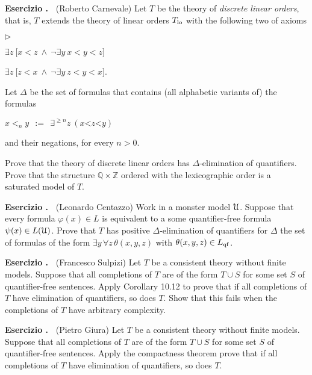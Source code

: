 \documentclass[10pt]{article}
\def\phi{\varphi}
\def\U{\EuScript U}
\def\ZZ{\mathds Z}
\def\QQ{\mathds Q}
\def\E{\exists}
\def\A{\forall}
\newcommand{\labella}[1]{{\sf\footnotesize #1}\hfill}
\renewenvironment{itemize}
  {\begin{list}{$\triangleright$}{%
   \setlength{\parskip}{0mm}
   \setlength{\topsep}{0mm}
   \setlength{\rightmargin}{0mm}
   \setlength{\listparindent}{0mm}
   \setlength{\itemindent}{0mm}
   \setlength{\labelwidth}{3ex}
   \setlength{\itemsep}{0mm}
   \setlength{\parsep}{0mm}
   \setlength{\partopsep}{0mm}
   \setlength{\labelsep}{1ex}
   \setlength{\leftmargin}{\labelwidth+\labelsep}
   \let\makelabel\labella}}{%
   \vspace*{-.3\baselineskip}
  \end{list}}
\newcounter{ex}
\newenvironment{exercise}{\bigskip\addtocounter{ex}{1}\textbf{Esercizio \theex.\ }}{}
\begin{document}
\begin{exercise}
  (Roberto Carnevale)
  Let $T$ be the theory of \emph{discrete linear orders}, that is, $T$ extends the theory of linear orders $T_{\rm lo}$ with the following two of axioms
  \begin{itemize}
  \item[dis$\uparrow$.] $\E z\ \big[x<z\ \wedge\ \neg\E y\ x<y<z\big]$
  \item[dis$\downarrow$.] $\E z\ \big[ z<x\ \wedge\ \neg\E y\ z<y<x\big]$.
  \end{itemize}
  Let $\Delta$ be the set of formulas that contains (all alphabetic variants of) the formulas 

  \hfil $x<_ny\ \ :=\ \ \E^{\ge n}z\ (x\mathord<z\mathord< y)$ 

  and their negations, for every $n>0$.

  Prove that the theory of discrete linear orders has $\Delta$-elimination of quantifiers.
  Prove that the structure $\QQ\times\ZZ$ ordered with the lexicographic order is a saturated model of $T$.
\end{exercise}

\begin{exercise}
  (Leonardo Centazzo)
  Work in a monster model $\U$.
  Suppose that every formula $\phi(x)\in L$ is equivalent to a some quantifier-free formula $\psi(x)\in L(\U)$.
  Prove that $T$ has positive $\Delta$-elimination of quantifiers for $\Delta$ the set of formulas of the form $\E y\,\A z\,\theta(x,y,z)$ with $\theta(x,y,z)\in L_{\rm qf}$.
\end{exercise}

\begin{exercise}
  (Francesco Sulpizi)
  Let $T$ be a consistent theory without finite models.
  Suppose that all completions of $T$ are of the form $T\cup S$ for some set $S$ of quantifier-free sentences.
  Apply Corollary 10.12 to prove that if all completions of $T$ have elimination of quantifiers, so does $T$.
  Show that this fails when the completions of $T$ have arbitrary complexity.
\end{exercise}

\begin{exercise}
  (Pietro Giura)
  Let $T$ be a consistent theory without finite models.
  Suppose that all completions of $T$ are of the form $T\cup S$ for some set $S$ of quantifier-free sentences.
  Apply the compactness theorem prove that if all completions of $T$ have elimination of quantifiers, so does $T$.
\end{exercise}
\end{document}

